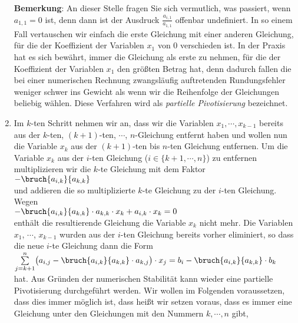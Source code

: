 \begin{enumerate}
      \textbf{Bemerkung}: An dieser Stelle fragen Sie sich vermutlich, was passiert, wenn
      $a_{1,1} = 0$ ist, denn dann ist der Ausdruck $\frac{a_{i,1}}{a_{1,1}}$ offenbar undefiniert.
      In so einem Fall vertauschen wir einfach die erste Gleichung mit einer anderen Gleichung,
      für die der Koeffizient der Variablen $x_1$ von $0$ verschieden ist.  In der Praxis hat es sich
      bewährt, immer die Gleichung als erste zu nehmen, für die der Koeffizient der Variablen $x_1$ den
      größten Betrag hat, denn dadurch fallen die bei  einer numerischen Rechnung zwangsläufig
      auftretenden  Rundungsfehler weniger schwer ins Gewicht als wenn wir die
      Reihenfolge der Gleichungen beliebig wählen.   Diese Verfahren wird als
      \emph{partielle Pivotisierung} bezeichnet.
\item Im $k$-ten Schritt nehmen wir an, dass wir die Variablen $x_1, \cdots, x_{k-1}$ bereits aus 
      der $k$-ten, $(k+1)$-ten, $\cdots$, $n$-Gleichung entfernt haben und wollen nun die 
      Variable $x_k$ aus der $(k+1)$-ten bis $n$-ten Gleichung entfernen. 
      Um die Variable $x_k$ aus der $i$-ten Gleichung ($i \in \{ k+1,\cdots, n\}$)
      zu entfernen multiplizieren wir die $k$-te Gleichung mit dem Faktor
      \\[0.2cm]
      \hspace*{1.3cm}
      $-\bruch{a_{i,k}}{a_{k,k}}$
      \\[0.2cm]
      und addieren die so multiplizierte $k$-te Gleichung zu der $i$-ten Gleichung.  Wegen
      \\[0.2cm]
      \hspace*{1.3cm}
      $-\bruch{a_{i,k}}{a_{k,k}} \cdot a_{k,k} \cdot x_k + a_{i,k} \cdot x_k = 0$
      \\[0.2cm]
      enthält die resultierende Gleichung die Variable $x_k$ nicht mehr.  Die Variablen
      $x_1$, $\cdots$, $x_{k-1}$ wurden aus der $i$-ten Gleichung bereits vorher 
      eliminiert, so dass die neue $i$-te Gleichung
      dann die Form
      \\[0.2cm]
      \hspace*{1.3cm}
      $\sum\limits_{j=k+1}^n \bigl(a_{i,j} - \bruch{a_{i,k}}{a_{k,k}} \cdot a_{k,j}\bigr) \cdot x_j =
       b_{i} - \bruch{a_{i,k}}{a_{k,k}} \cdot b_{k}
      $
      \\[0.2cm]
      hat.   Aus Gründen der numerischen Stabilität kann wieder eine partielle Pivotisierung durchgeführt
      werden.  Wir wollen im Folgenden voraussetzen, dass dies immer möglich ist, dass heißt wir setzen
      voraus, dass es immer eine Gleichung unter den Gleichungen mit den Nummern $k,\cdots,n$ gibt,

\end{enumerate}
